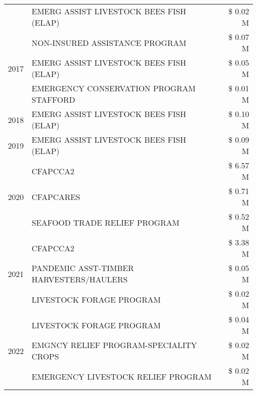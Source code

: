 \begin{tabular}{llr}
 & EMERG ASSIST LIVESTOCK BEES FISH (ELAP) & \$ 0.02 M \\
\cline{1-3}
\multirow[t]{3}{*}{2017} & NON-INSURED ASSISTANCE PROGRAM & \$ 0.07 M \\
 & EMERG ASSIST LIVESTOCK BEES FISH (ELAP) & \$ 0.05 M \\
 & EMERGENCY CONSERVATION PROGRAM STAFFORD & \$ 0.01 M \\
\cline{1-3}
2018 & EMERG ASSIST LIVESTOCK BEES FISH (ELAP) & \$ 0.10 M \\
\cline{1-3}
2019 & EMERG ASSIST LIVESTOCK BEES FISH (ELAP) & \$ 0.09 M \\
\cline{1-3}
\multirow[t]{3}{*}{2020} & CFAPCCA2 & \$ 6.57 M \\
 & CFAPCARES & \$ 0.71 M \\
 & SEAFOOD TRADE RELIEF PROGRAM & \$ 0.52 M \\
\cline{1-3}
\multirow[t]{3}{*}{2021} & CFAPCCA2 & \$ 3.38 M \\
 & PANDEMIC ASST-TIMBER HARVESTERS/HAULERS & \$ 0.05 M \\
 & LIVESTOCK FORAGE PROGRAM & \$ 0.02 M \\
\cline{1-3}
\multirow[t]{3}{*}{2022} & LIVESTOCK FORAGE PROGRAM & \$ 0.04 M \\
 & EMGNCY RELIEF PROGRAM-SPECIALITY CROPS & \$ 0.02 M \\
 & EMERGENCY LIVESTOCK RELIEF PROGRAM & \$ 0.02 M \\
\cline{1-3}
\bottomrule
\end{tabular}
